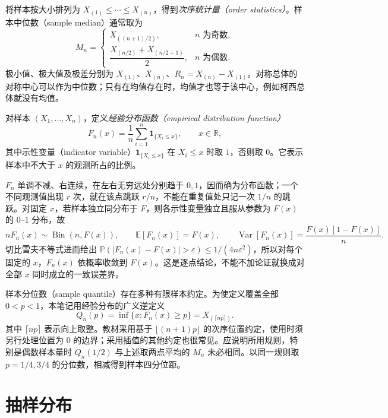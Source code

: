 将样本按大小排列为 $X_{(1)}\le\cdots\le X_{(n)}$，得到\emph{次序统计量（order statistics）}。样本中位数（sample median）通常取为
\[
  M_n=
  \begin{cases}
    X_{((n+1)/2)},&n\text{ 为奇数},\\
    \dfrac{X_{(n/2)}+X_{(n/2+1)}}2,&n\text{ 为偶数}.
  \end{cases}
\]
极小值、极大值及极差分别为 $X_{(1)}$、$X_{(n)}$、$R_n=X_{(n)}-X_{(1)}$。对称总体的对称中心可以作为中位数；只有在均值存在时，均值才也等于该中心，例如柯西总体就没有均值。

\begin{definition}[经验分布函数]
\label{def:study-empirical-cdf}
对样本 $(X_1,\ldots,X_n)$，定义\emph{经验分布函数（empirical distribution function）}
\begin{equation}
  F_n(x)=\frac1n\sum_{i=1}^{n}\mathbf 1_{\{X_i\le x\}},
  \qquad x\in\mathbb R,
  \label{eq:study-empirical-cdf}
\end{equation}
其中示性变量（indicator variable）$\mathbf 1_{\{X_i\le x\}}$ 在 $X_i\le x$ 时取 $1$，否则取 $0$。它表示样本中不大于 $x$ 的观测所占的比例。
\end{definition}

$F_n$ 单调不减、右连续，在左右无穷远处分别趋于 $0,1$，因而确为分布函数；一个不同观测值出现 $r$ 次，就在该点跳跃 $r/n$，不能在重复值处只记一次 $1/n$ 的跳跃。对固定 $x$，若样本独立同分布于 $F$，则各示性变量独立且服从参数为 $F(x)$ 的 $0$--$1$ 分布，故
\begin{equation}
  nF_n(x)\sim\operatorname{Bin}(n,F(x)),\qquad
  \mathbb E[F_n(x)]=F(x),\qquad
  \operatorname{Var}[F_n(x)]=\frac{F(x)[1-F(x)]}{n}.
  \label{eq:study-empirical-cdf-law}
\end{equation}
切比雪夫不等式进而给出 $\mathbb P(|F_n(x)-F(x)|>\varepsilon)\le1/(4n\varepsilon^2)$，所以对每个固定的 $x$，$F_n(x)$ 依概率收敛到 $F(x)$。这是逐点结论，不能不加论证就换成对全部 $x$ 同时成立的一致误差界。

样本分位数（sample quantile）存在多种有限样本约定。为使定义覆盖全部 $0<p<1$，本笔记用经验分布的广义逆定义
\[
  Q_n(p)=\inf\{x:F_n(x)\ge p\}=X_{(\lceil np\rceil)}.
\]
其中 $\lceil np\rceil$ 表示向上取整。教材采用基于 $\lfloor(n+1)p\rfloor$ 的次序位置约定，使用时须另行处理位置为 $0$ 的边界；采用插值的其他约定也很常见。应说明所用规则，特别是偶数样本量时 $Q_n(1/2)$ 与上述取两点平均的 $M_n$ 未必相同。以同一规则取 $p=1/4,3/4$ 的分位数，相减得到样本四分位距。

\section{抽样分布}
\label{sec:study-sampling-distributions}

